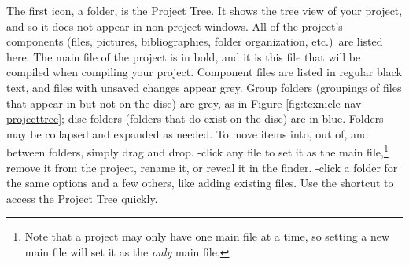 The first icon, a folder, is the Project Tree. It shows the tree view of your project, and so it does not appear in non-project windows. All of the project's components (files, pictures, bibliographies, folder organization, etc.)\ are listed here. The main file of the project is in bold, and it is this file that will be compiled when compiling your project. Component files are listed in regular black text, and files with unsaved changes appear grey. Group folders (groupings of files that appear in \texnicle but not on the disc) are grey, as in Figure \ref{fig:texnicle-nav-projecttree}; disc folders (folders that do exist on the disc) are in blue. Folders may be collapsed and expanded as needed. To move items into, out of, and between folders, simply drag and drop. \keys{\ctlkey}-click any file to set it as the main file,\footnote{Note that a project may only have one main file at a time, so setting a new main file will set it as the \emph{only} main file.} remove it from the project, rename it, or reveal it in the finder. \keys{\ctlkey}-click a folder for the same options and a few others, like adding existing files. Use the shortcut  to access the Project Tree quickly.


